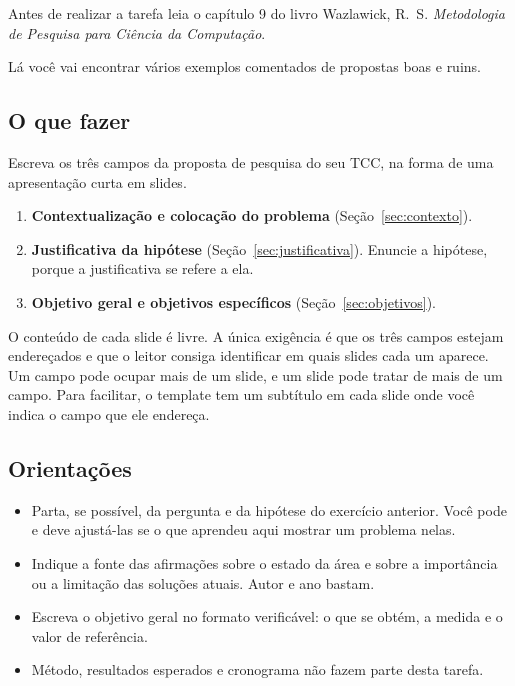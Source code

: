 \documentclass[10pt,a4paper]{extarticle}
\theoremstyle{definition}
\begin{document}
\begin{keybox}[Recomendação]

Antes de realizar a tarefa leia o capítulo 9 do livro Wazlawick, R.\ S. \emph{Metodologia de Pesquisa para Ciência da Computação}.

Lá você vai encontrar vários exemplos comentados de propostas boas e ruins. 
\end{keybox}

\subsection{O que fazer}

Escreva os três campos da proposta de pesquisa do seu TCC, na forma de uma apresentação curta em slides.
\begin{enumerate}[label=\textbf{\arabic*.}]
  \item \textbf{Contextualização e colocação do problema} (Seção~\ref{sec:contexto}).
  \item \textbf{Justificativa da hipótese} (Seção~\ref{sec:justificativa}). Enuncie a hipótese, porque a justificativa se refere a ela.
  \item \textbf{Objetivo geral e objetivos específicos} (Seção~\ref{sec:objetivos}).
\end{enumerate}

O conteúdo de cada slide é livre. A única exigência é que os três campos estejam endereçados e que o leitor consiga identificar em quais slides cada um aparece. Um campo pode ocupar mais de um slide, e um slide pode tratar de mais de um campo. Para facilitar, o template tem um subtítulo em cada slide onde você indica o campo que ele endereça.

\subsection{Orientações}

\begin{itemize}
  \item Parta, se possível, da pergunta e da hipótese do exercício anterior. Você pode e deve ajustá-las se o que aprendeu aqui mostrar um problema nelas.
  \item Indique a fonte das afirmações sobre o estado da área e sobre a importância ou a limitação das soluções atuais. Autor e ano bastam.
  \item Escreva o objetivo geral no formato verificável: o que se obtém, a medida e o valor de referência.
  \item Método, resultados esperados e cronograma não fazem parte desta tarefa.
\end{itemize}
\end{document}

